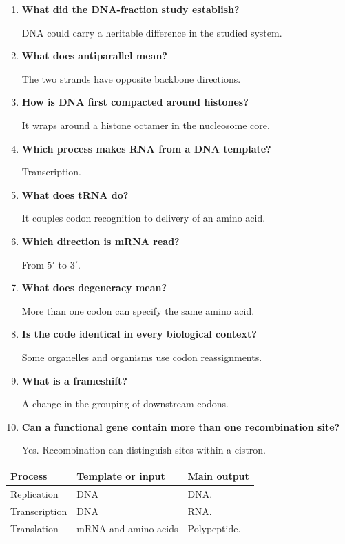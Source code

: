 \documentclass[12pt,a4paper]{article}
\newcommand{\Q}[1]{\textbf{#1}\par\noindent\ignorespaces}
\begin{document}
\begin{tcolorbox}[exambox, title={Frequently Asked / Viva Questions}]
\begin{enumerate}[topsep=0pt, label=\textbf{Q\arabic*.}, itemsep=5pt, leftmargin=*]
  \item \Q{What did the DNA-fraction study establish?}
    DNA could carry a heritable difference in the studied system.
  \item \Q{What does antiparallel mean?}
    The two strands have opposite backbone directions.
  \item \Q{How is DNA first compacted around histones?}
    It wraps around a histone octamer in the nucleosome core.
  \item \Q{Which process makes RNA from a DNA template?}
    Transcription.
  \item \Q{What does tRNA do?}
    It couples codon recognition to delivery of an amino acid.
  \item \Q{Which direction is mRNA read?}
    From $5'$ to $3'$.
  \item \Q{What does degeneracy mean?}
    More than one codon can specify the same amino acid.
  \item \Q{Is the code identical in every biological context?}
    Some organelles and organisms use codon reassignments.
  \item \Q{What is a frameshift?}
    A change in the grouping of downstream codons.
  \item \Q{Can a functional gene contain more than one recombination site?}
    Yes. Recombination can distinguish sites within a cistron.
\end{enumerate}
\end{tcolorbox}

\begin{tcolorbox}[tikzbox, title={Summary Comparison}]
\par\vspace{5pt}
\begingroup
\setlength{\extrarowheight}{1pt}
\noindent\begin{tabularx}{\linewidth}{|B{3.45cm}|Y|Y|}
\hline
\textbf{Process} & \textbf{Template or input} & \textbf{Main output} \\ \hline
Replication & DNA & DNA. \\ \hline
Transcription & DNA & RNA. \\ \hline
Translation & mRNA and amino acids & Polypeptide. \\ \hline
\end{tabularx}\par
\endgroup
\end{tcolorbox}
\end{document}
